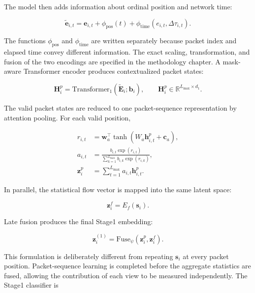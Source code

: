 The model then adds information about ordinal position and network time:

\begin{equation}
\widetilde{\mathbf{e}}_{i,t}
=
\mathbf{e}_{i,t}
+\phi_{\mathrm{pos}}(t)
+\phi_{\mathrm{time}}(e_{i,t},\Delta\tau_{i,t}).
\end{equation}

The functions $\phi_{\mathrm{pos}}$ and $\phi_{\mathrm{time}}$ are written
separately because packet index and elapsed time convey different information.
The exact scaling, transformation, and fusion of the two encodings are specified
in the methodology chapter. A mask-aware Transformer encoder
\cite{Vaswani2017} produces contextualized packet states:

\begin{equation}
\mathbf{H}^{p}_i
=
\mathrm{Transformer}_{1}
\left(
    \widetilde{\mathbf{E}}_i;
    \mathbf{b}_i
\right),
\qquad
\mathbf{H}^{p}_i\in\mathbb{R}^{L_{\max}\times d_1}.
\end{equation}

The valid packet states are reduced to one packet-sequence representation by
attention pooling. For each valid position,

\begin{align}
r_{i,t} &=
\mathbf{w}_{a}^{\top}
\tanh(W_a\mathbf{h}^{p}_{i,t}+\mathbf{c}_a),\\
a_{i,t} &=
\frac{
    b_{i,t}\exp(r_{i,t})
}{
    \sum_{k=1}^{L_{\max}}b_{i,k}\exp(r_{i,k})
},\\
\mathbf{z}^{p}_i &=
\sum_{t=1}^{L_{\max}}a_{i,t}\mathbf{h}^{p}_{i,t}.
\end{align}

In parallel, the statistical flow vector is mapped into the same latent space:

\begin{equation}
\mathbf{z}^{f}_i=E_f(\mathbf{s}_i).
\end{equation}

Late fusion produces the final Stage1 embedding:

\begin{equation}
\mathbf{z}^{(1)}_i
=
\mathrm{Fuse}_{\psi}
\left(
    \mathbf{z}^{p}_i,
    \mathbf{z}^{f}_i
\right).
\label{eq:stage1_fusion}
\end{equation}

This formulation is deliberately different from repeating
$\mathbf{s}_i$ at every packet position. Packet-sequence learning is completed
before the aggregate statistics are fused, allowing the contribution of each
view to be measured independently. The Stage1 classifier is

